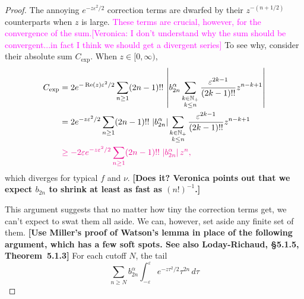 \documentclass{article}
\theoremstyle{definition}
\begin{document}
\begin{proof}
The annoying $e^{-z\varepsilon^2/2}$ correction terms are dwarfed by their $z^{-(n+1/2)}$ counterparts when $z$ is large. \textcolor{magenta}{These terms are crucial, however, for the convergence of the sum.[Veronica: I don't understand why the sum should be convergent...in fact I think we should get a divergent series]} To see why, consider their absolute sum $C_\text{exp}$. When $z \in [0, \infty)$,
\begin{align*}
C_\text{exp} & = 2e^{-\operatorname{Re}(z)\varepsilon^2/2} \sum_{n \ge 1} (2n-1)!!\,\left| b_{2n}^\alpha \sum_{\substack{k \in \mathbb{N}_+ \\ k \le n}} \frac{\varepsilon^{2k-1}}{(2k-1)!!} z^{n-k+1} \right| \\
& = 2e^{-z\varepsilon^2/2} \sum_{n \ge 1} (2n-1)!!\,\left|b_{2n}^\alpha\right| \sum_{\substack{k \in \mathbb{N}_+ \\ k \le n}} \frac{\varepsilon^{2k-1}}{(2k-1)!!} z^{n-k+1} \\
& \color{magenta}\ge -2\varepsilon e^{-z\varepsilon^2/2} \sum_{n \ge 1} (2n-1)!!\,\left|b_{2n}^\alpha\right| z^n,
\end{align*}
\color{black}
which diverges for typical $f$ and $\nu$. \textbf{[Does it? Veronica points out that we expect $b_{2n}$ to shrink at least as fast as $(n!)^{-1}$.]}

This argument suggests that no matter how tiny the correction terms get, we can't expect to swat them all aside. We can, however, set aside any finite set of them. \color{violet}\textbf{[Use Miller's proof of Watson's lemma in place of the following argument, which has a few soft spots. See also Loday-Richaud, \S 5.1.5, Theorem~5.1.3]} For each cutoff $N$, the tail
\[ \sum_{n \ge N} b_{2n}^\alpha \int_{-\varepsilon}^\varepsilon e^{-z\tau^2/2} \tau^{2n}\,d\tau \]


\end{proof}
\end{document}
